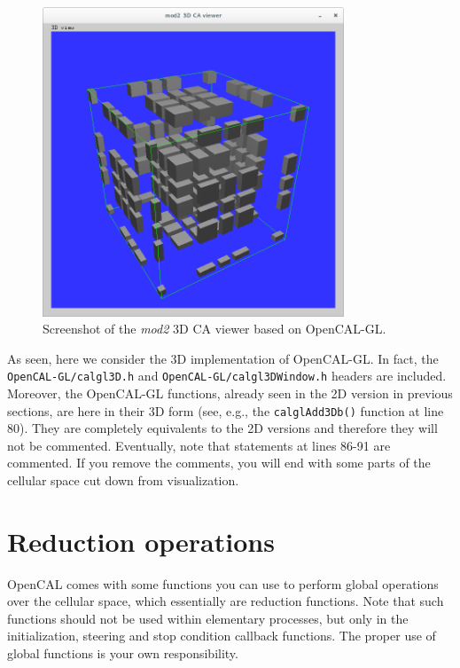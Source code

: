 

\begin{figure}
  \begin{center}
    \includegraphics[width=9cm]{./images/OpenCAL/calgl_mod2}
    \caption{Screenshot of the \emph{mod2} 3D CA viewer based on
      OpenCAL-GL.}
    \label{fig:calgl_mod2}
  \end{center}
\end{figure}

As seen, here we consider the 3D implementation of
OpenCAL-GL. In fact, the \verb'OpenCAL-GL/calgl3D.h' and
\verb'OpenCAL-GL/calgl3DWindow.h' headers are included. Moreover, the
OpenCAL-GL functions, already seen in the 2D version in previous
sections, are here in their 3D form (see, e.g., the
\verb'calglAdd3Db()' function at line 80). They are
completely equivalents to the 2D versions and therefore they will not
be commented. Eventually, note that statements at lines 86-91 are
commented. If you remove the comments, you will end with some parts of
the cellular space cut down from visualization.


\section{Reduction operations}\label{sec:redution}

OpenCAL comes with some functions you can use to perform global
operations over the cellular space, which essentially are reduction
functions. Note that such functions should not be used within
elementary processes, but only in the initialization, steering and
stop condition callback functions. The proper use of global functions
is your own responsibility.

